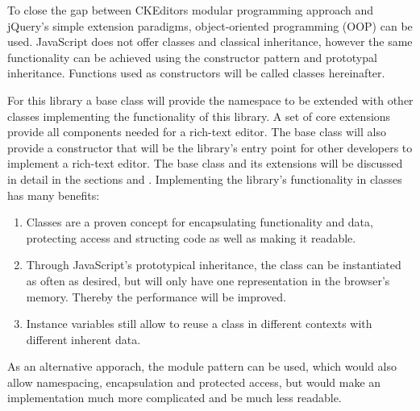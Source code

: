 
To close the gap between CKEditors modular programming approach and jQuery's simple extension paradigms, object-oriented programming (OOP) can be used. JavaScript does not offer classes and classical inheritance, however the same functionality can be achieved using the constructor pattern and prototypal inheritance. Functions used as constructors will be called classes hereinafter.

For this library a base class will provide the namespace to be extended with other classes implementing the functionality of this library. A set of core extensions provide all components needed for a rich-text editor. The base class will also provide a constructor that will be the library's entry point for other developers to implement a rich-text editor. The base class and its extensions will be discussed in detail in the sections  and . Implementing the library's functionality in classes has many benefits:

\begin{enumerate}
\item Classes are a proven concept for encapsulating functionality and data, protecting access and structing code as well as making it readable.
\item Through JavaScript's prototypical inheritance, the class can be instantiated as often as desired, but will only have one representation in the browser's memory. Thereby the performance will be improved.
\item Instance variables still allow to reuse a class in different contexts with different inherent data. %
\end{enumerate}

As an alternative apporach, the module pattern can be used, which would also allow namespacing, encapsulation and protected access, but would make an implementation much more complicated and be much less readable.




